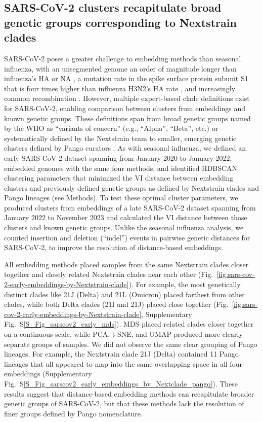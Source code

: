 \documentclass[webpdf,contemporary,large,single]{oup-authoring-template}%
\theoremstyle{thmstyleone}%
\theoremstyle{thmstyletwo}%
\theoremstyle{thmstylethree}%
\begin{document}
\subsection{SARS-CoV-2 clusters recapitulate broad genetic groups corresponding to Nextstrain clades}

SARS-CoV-2 poses a greater challenge to embedding methods than seasonal influenza, with an unsegmented genome an order of magnitude longer than influenza's HA or NA \citep{Zhu2020}, a mutation rate in the spike surface protein subunit S1 that is four times higher than influenza H3N2's HA rate \citep{Kistler2022}, and increasingly common recombination \citep{Focosi2022,Turakhia2022}.
However, multiple expert-based clade definitions exist for SARS-CoV-2, enabling comparison between clusters from embeddings and known genetic groups.
These definitions span from broad genetic groups named by the WHO as ``variants of concern'' (e.g., ``Alpha'', ``Beta'', etc.) \citep{Konings2021} or systematically defined by the Nextstrain team \citep{Hodcroft2020,Bedford2021,Roemer2022} to smaller, emerging genetic clusters defined by Pango curators \citep{OToole2021}.
As with seasonal influenza, we defined an early SARS-CoV-2 dataset spanning from January 2020 to January 2022, embedded genomes with the same four methods, and identified HDBSCAN clustering parameters that minimized the VI distance between embedding clusters and previously defined genetic groups as defined by Nextstrain clades and Pango lineages (see Methods).
To test these optimal cluster parameters, we produced clusters from embeddings of a late SARS-CoV-2 dataset spanning from January 2022 to November 2023 and calculated the VI distance between those clusters and known genetic groups.
Unlike the seasonal influenza analysis, we counted insertion and deletion (``indel'') events in pairwise genetic distances for SARS-CoV-2, to improve the resolution of distance-based embeddings.

All embedding methods placed samples from the same Nextstrain clades closer together and closely related Nextstrain clades near each other (Fig.~\ref{fig:sars-cov-2-early-embeddings-by-Nextstrain-clade}).
For example, the most genetically distinct clades like 21J (Delta) and 21L (Omicron) placed farthest from other clades, while both Delta clades (21I and 21J) placed close together (Fig.~\ref{fig:sars-cov-2-early-embeddings-by-Nextstrain-clade}, Supplementary Fig.~S\ref{S_Fig_sarscov2_early_mds}).
MDS placed related clades closer together on a continuous scale, while PCA, t-SNE, and UMAP produced more clearly separate groups of samples.
We did not observe the same clear grouping of Pango lineages.
For example, the Nextstrain clade 21J (Delta) contained 11 Pango lineages that all appeared to map into the same overlapping space in all four embeddings (Supplementary Fig.~S\ref{S_Fig_sarscov2_early_embeddings_by_Nextclade_pango}).
These results suggest that distance-based embedding methods can recapitulate broader genetic groups of SARS-CoV-2, but that these methods lack the resolution of finer groups defined by Pango nomenclature.
\end{document}
